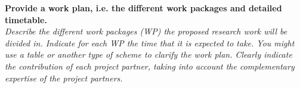 \documentclass[11pt,dvipsnames,usenames,a4paper]{article}
\begin{document}
%

\vspace{7pt}

\textbf{Provide a work plan, i.e. the different work packages and detailed timetable.}\\
\textit{Describe the different work packages (WP) the proposed research work will be divided in.
Indicate for each WP the time that it is expected to take.
You might use a table or another type of scheme to clarify the work plan. Clearly indicate the contribution of each project partner, taking into account the complementary expertise of the project partners.}

\end{document}
